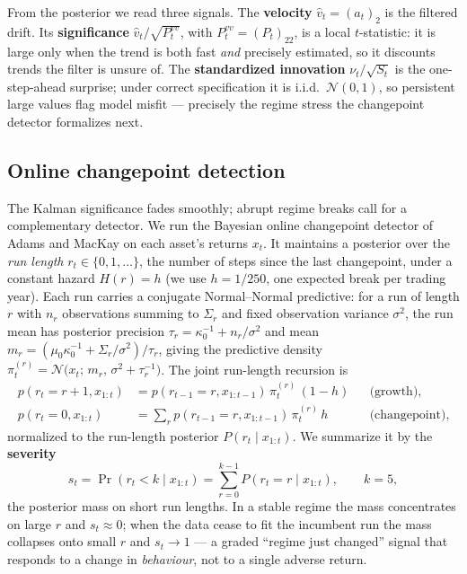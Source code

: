 \documentclass[11pt,a4paper]{article}
\theoremstyle{definition}
\begin{document}
From the posterior we read three signals. The \textbf{velocity} $\hat v_t=(a_t)_2$ is the filtered
drift. Its \textbf{significance} $\hat v_t/\sqrt{P^{vv}_t}$, with $P^{vv}_t=(P_t)_{22}$, is a local
$t$-statistic: it is large only when the trend is both fast \emph{and} precisely estimated, so it
discounts trends the filter is unsure of. The \textbf{standardized innovation} $\nu_t/\sqrt{S_t}$ is
the one-step-ahead surprise; under correct specification it is i.i.d.\ $\mathcal N(0,1)$, so
persistent large values flag model misfit --- precisely the regime stress the changepoint detector
formalizes next.

\subsection{Online changepoint detection}
The Kalman significance fades smoothly; abrupt regime breaks call for a complementary detector. We
run the Bayesian online changepoint detector of Adams and MacKay \cite{adams2007} on each asset's
returns $x_t$. It maintains a posterior over the \emph{run length} $r_t\in\{0,1,\dots\}$, the number
of steps since the last changepoint, under a constant hazard $H(r)=h$ (we use $h=1/250$, one expected
break per trading year). Each run carries a conjugate Normal--Normal predictive: for a run of length
$r$ with $n_r$ observations summing to $\Sigma_r$ and fixed observation variance $\sigma^2$, the run
mean has posterior precision $\tau_r=\kappa_0^{-1}+n_r/\sigma^2$ and mean
$m_r=(\mu_0\kappa_0^{-1}+\Sigma_r/\sigma^2)/\tau_r$, giving the predictive density
$\pi^{(r)}_t=\mathcal N\!\big(x_t;\,m_r,\,\sigma^2+\tau_r^{-1}\big)$. The joint run-length recursion is
\begin{align}
p(r_t=r{+}1,x_{1:t}) &= p(r_{t-1}=r,x_{1:t-1})\,\pi^{(r)}_t\,(1-h) && \text{(growth)},\\
p(r_t=0,x_{1:t}) &= \textstyle\sum_{r} p(r_{t-1}=r,x_{1:t-1})\,\pi^{(r)}_t\,h && \text{(changepoint)},
\end{align}
normalized to the run-length posterior $P(r_t\mid x_{1:t})$. We summarize it by the \textbf{severity}
\begin{equation}
s_t=\Pr(r_t<k\mid x_{1:t})=\sum_{r=0}^{k-1}P(r_t=r\mid x_{1:t}),\qquad k=5,
\end{equation}
the posterior mass on short run lengths. In a stable regime the mass concentrates on large $r$ and
$s_t\approx0$; when the data cease to fit the incumbent run the mass collapses onto small $r$ and
$s_t\to1$ --- a graded ``regime just changed'' signal that responds to a change in \emph{behaviour},
not to a single adverse return.
\end{document}
